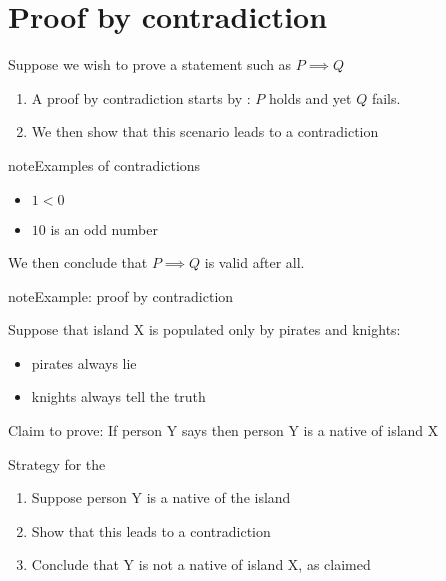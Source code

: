 \documentclass[letterpaper,10pt,english]{jupyterBook}
\begin{document}
\section{Proof by contradiction}
\label{\detokenize{03.set_theory:proof-by-contradiction}}
\sphinxAtStartPar
Suppose we wish to prove a statement such as \(P \implies Q\)
\begin{enumerate}
%
\item {} 
\sphinxAtStartPar
A proof by contradiction starts by : \(P\) holds and yet \(Q\) fails.

\item {} 
\sphinxAtStartPar
We then show that this scenario leads to a contradiction

\end{enumerate}

\begin{sphinxadmonition}{note}{Examples of contradictions}
\begin{itemize}
\item {} 
\sphinxAtStartPar
\(1 < 0\)

\item {} 
\sphinxAtStartPar
\(10\) is an odd number

\end{itemize}
\end{sphinxadmonition}

\sphinxAtStartPar
We then conclude that \(P \implies Q\) is valid after all.

\begin{sphinxadmonition}{note}{Example: proof by contradiction}

\sphinxAtStartPar
Suppose that island X is populated only by pirates and knights:
\begin{itemize}
\item {} 
\sphinxAtStartPar
pirates always lie

\item {} 
\sphinxAtStartPar
knights always tell the truth

\end{itemize}

\sphinxAtStartPar
Claim to prove: If person Y says  then person Y is  a native of island X
\end{sphinxadmonition}

\sphinxAtStartPar
Strategy for the 
\begin{enumerate}
%
\item {} 
\sphinxAtStartPar
Suppose person Y is a native of the island

\item {} 
\sphinxAtStartPar
Show that this leads to a contradiction

\item {} 
\sphinxAtStartPar
Conclude that Y is not a native of island X, as claimed

\end{enumerate}
\end{document}
